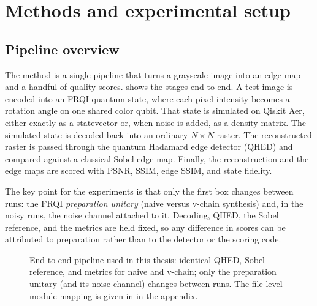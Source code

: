 \chapter{Methods and experimental setup}\label{ch:methods}
\thispagestyle{pagestyle}

\graphicspath{{../../outputs/}{images/}{../../thesis/design/figures/}}

\section{Pipeline overview}
\label{sec:pipeline-overview}
The method is a single pipeline that turns a grayscale image into an edge map and a handful of quality scores.  shows the stages end to end. A test image is encoded into an FRQI quantum state, where each pixel intensity becomes a rotation angle on one shared color qubit. That state is simulated on Qiskit Aer, either exactly as a statevector or, when noise is added, as a density matrix. The simulated state is decoded back into an ordinary $N\times N$ raster. The reconstructed raster is passed through the quantum Hadamard edge detector (QHED) and compared against a classical Sobel edge map. Finally, the reconstruction and the edge maps are scored with PSNR, SSIM, edge SSIM, and state fidelity.

The key point for the experiments is that only the first box changes between runs: the FRQI \emph{preparation unitary} (naive versus v-chain synthesis) and, in the noisy runs, the noise channel attached to it. Decoding, QHED, the Sobel reference, and the metrics are held fixed, so any difference in scores can be attributed to preparation rather than to the detector or the scoring code.

\begin{figure}[htbp]
\centering
{}
\caption{End-to-end pipeline used in this thesis: identical QHED, Sobel reference, and metrics for naive and v-chain; only the preparation unitary (and its noise channel) changes between runs. The file-level module mapping is given in  in the appendix.}
\label{fig:pipeline-flow}
\end{figure}

